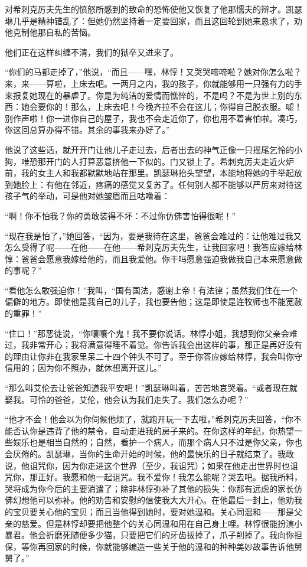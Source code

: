 \par 对希刺克厉夫先生的愤怒所感到的致命的恐怖使他又恢复了他那懦夫的辩才。凯瑟琳几乎是精神错乱了：但她仍然坚持着一定要回家，而且这回轮到她来恳求了，劝他克制他那自私的苦恼。
\par 他们正在这样纠缠不清，我们的狱卒又进来了。
\par “你们的马都走掉了，”他说，“而且——嘿，林惇！又哭哭啼啼啦？她对你怎么啦？来，来——算啦，上床去吧。一两月之内，我的孩子，你就能够用一只强有力的手来报复她现在的暴虐了。你是为纯洁的爱情而憔悴的，不是吗？不是为世上别的东西：她会要你的！那么，上床去吧！今晚齐拉不会在这儿；你得自己脱衣服。嘘！别作声啦！你一进你自己的屋子，我也不会走近你了，你也用不着害怕啦。凑巧，你这回总算办得不错。其余的事我来办好了。”
\par 他说了这些话，就开开门让他儿子走过去，后者出去的神气正像一只摇尾乞怜的小狗，唯恐那开门的人打算恶意挤他一下似的。门又锁上了。希刺克厉夫走近火炉前，我的女主人和我都默默地站在那里。凯瑟琳抬头望望，本能地将她的手举起放到她脸上：有他在邻近，疼痛的感觉又复苏了。任何别人都不能够以严厉来对待这孩子气的举动，可是他对她皱眉而且咕噜着：
\par “啊！你不怕我？你的勇敢装得不坏：不过你仿佛害怕得很呢！”
\par “现在我是怕了，”她回答，“因为，要是我待在这里，爸爸会难过的：让他难过我又怎么受得了呢——在他——在他——希刺克厉夫先生，让我回家吧！我答应嫁给林惇：爸爸会愿意我嫁给他的，而且我爱他。你干吗愿意强迫我做我自己本来愿意做的事呢？”
\par “看他怎么敢强迫你！”我叫，“国有国法，感谢上帝！有法律；虽然我们住在一个偏僻的地方。即使他是我自己的儿子，我也要告他；这是即使是连牧师也不能宽赦的重罪！”
\par “住口！”那恶徒说，“你嚷嚷个鬼！我不要你说话。林惇小姐，我想到你父亲会难过，我非常开心；我将满意得睡不着觉。你告诉我会出这样的事，那正是再好没有的理由让你非在我家里呆二十四个钟头不可了。至于你答应嫁给林惇，我会叫你守信用的；因为你不照办，就休想离开这儿。”
\par “那么叫艾伦去让爸爸知道我平安吧！”凯瑟琳叫着，苦苦地哀哭着。“或者现在就娶我。可怜的爸爸，艾伦，他会认为我们走失了。我们怎么办呢？”
\par “他才不会！他会以为你伺候他烦了，就跑开玩一下去啦，”希刺克厉夫回答，“你不能否认你是违背了他的禁令，自动走进我的房子来的。在你这样的年纪，你热望一些娱乐也是相当自然的；自然，看护一个病人，而那个病人只不过是你父亲，你也会厌倦的。凯瑟琳，当你的生命开始的时候，他的最快乐的日子就结束了。我敢说，他诅咒你，因为你走进这个世界（至少，我诅咒）；如果在他走出世界时也诅咒你，那正好。我愿和他一起诅咒。我不爱你！我怎么能呢？哭去吧。据我所料，哭将成为你今后的主要消遣了；除非林惇弥补了其他的损失：你那有远虑的家长仿佛幻想他可以弥补。他的劝告和安慰的信使我大大开心。在他最后一封上，他劝我的宝贝要关心他的宝贝；而且当他得到她时，要对她温和。关心同温和——那是父亲的慈爱。但是林惇却要把他整个的关心同温和用在自己身上哩。林惇很能扮演小暴君。他会折磨死随便多少猫，只要把它们的牙齿拔掉了，爪子削掉了。我向你担保，等你再回家的时候，你就能够编造一些关于他的温和的种种美妙故事告诉他舅舅了。”
